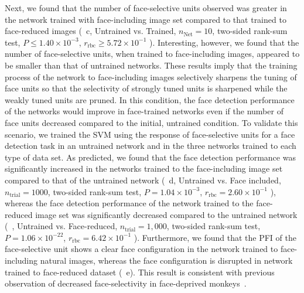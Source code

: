 \documentclass[final,3p,times,twocolumn]{elsarticle}
\begin{document}
Next, we found that the number of face-selective units observed was greater in the network trained with face-including image set compared to that trained to face-reduced images 
(~c, Untrained vs. Trained,
$ n_\textrm{Net} = 10 $,
two-sided rank-sum test,
$ P \leq 1.40 \times 10 ^{-3} $,
$ r_\textrm{rbc} \geq 5.72 \times 10^{-1} $
).
Interesting, however, we found that the number of face-selective units, when trained to face-including images, appeared to be smaller than that of untrained networks.
These results imply that the training process of the network to face-including images selectively sharpens the tuning of face units so that the selectivity of strongly tuned units is sharpened while the weakly tuned units are pruned.
In this condition, the face detection performance of the networks would improve in face-trained networks even if the number of face units decreased compared to the initial, untrained condition.
To validate this scenario, we trained the SVM using the response of face-selective units for a face detection task in an untrained network and in the three networks trained to each type of data set.
As predicted, we found that the face detection performance was significantly increased in the networks trained to the face-including image set compared to that of the untrained network
(~d, Untrained vs. Face included, 
$ n_\textrm{trial} = 1000 $,
two-sided rank-sum test,
$ P = 1.04 \times 10^{-3} $,
$ r_\textrm{rbc} = 2.60 \times 10^{-1} $
),
whereas the face detection performance of the network trained to the face-reduced image set was significantly decreased compared to the untrained network
(~, Untrained vs. Face-reduced,
$ n_\textrm{trial} = 1,000 $,
two-sided rank-sum test,
$ P = 1.06 \times 10^{-22} $,
$ r_\textrm{rbc} = 6.42 \times 10^{-1} $
).
Furthermore, we found that the PFI of the face-selective unit shows a clear face configuration in the network trained to face-including natural images,
whereas the face configuration is disrupted in network trained to face-reduced dataset (~e).
This result is consistent with previous observation of decreased face-selectivity in face-deprived monkeys~\cite{arcaro2017seeing}.
\end{document}
